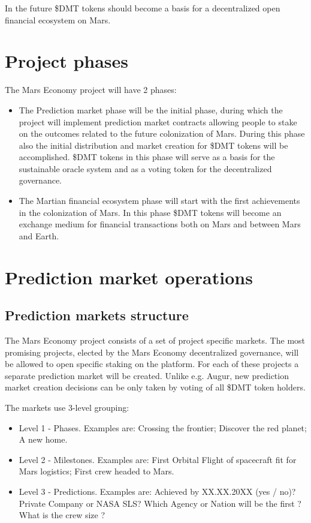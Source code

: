 \documentclass[12pt]{article}
\begin{document}
In the future \$DMT tokens should become a basis for a decentralized open financial ecosystem on Mars.
 
\section{Project phases}

The Mars Economy project will have 2 phases:
\begin{itemize}
    \item{The Prediction market phase} will be the initial phase, during which the project will implement prediction market contracts allowing people to stake on the outcomes related to the future colonization of Mars. During this phase also the initial distribution and market creation for \$DMT tokens will be accomplished. \$DMT tokens in this phase will serve as a basis for the sustainable oracle system and as a voting token for the decentralized governance.
    \item{The Martian financial ecosystem phase} will start with the first achievements in the colonization of Mars. In this phase \$DMT tokens will become an exchange medium for financial transactions both on Mars and between Mars and Earth.
\end{itemize}

\section{Prediction market operations}

\subsection{Prediction markets structure}
The Mars Economy project consists of a set of project specific markets. The most promising projects, elected by the Mars Economy decentralized governance, will be allowed to open specific staking on the platform. For each of these projects a separate prediction market will be created. Unlike e.g. Augur, new prediction market creation decisions can be only taken by voting of all \$DMT token holders.

The markets use 3-level grouping: 
\begin{itemize}
\item{Level 1 - Phases.} Examples are: Crossing the frontier; Discover the red planet; A new home.
\item{Level 2 - Milestones.} Examples are: First Orbital Flight of spacecraft fit for Mars logistics; First crew headed to Mars.
\item{Level 3 - Predictions.} Examples are: Achieved by XX.XX.20XX (yes / no)? Private Company or NASA SLS? Which Agency or Nation will be the first ? What is the crew size ?
\end{itemize}
\end{document}
